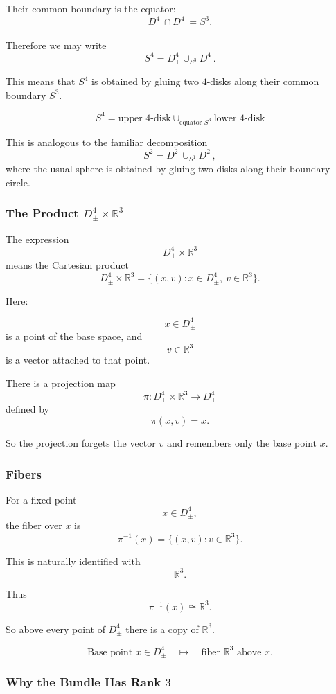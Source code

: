 \documentclass[12pt,a4paper]{article}
\theoremstyle{notespace}
\begin{document}
Their common boundary is the equator:
\[
D^4_+\cap D^4_-=S^3.
\]

Therefore we may write
\[
S^4=D^4_+\cup_{S^3}D^4_-.
\]

This means that \(S^4\) is obtained by gluing two \(4\)-disks along their common boundary \(S^3\).

\[
\boxed{
	S^4
	=
	\text{upper }4\text{-disk}
	\cup_{\text{equator }S^3}
	\text{lower }4\text{-disk}
}
\]

This is analogous to the familiar decomposition
\[
S^2=D^2_+\cup_{S^1}D^2_-,
\]
where the usual sphere is obtained by gluing two disks along their boundary circle.

\subsubsection{The Product \(D^4_\pm\times \mathbb R^3\)}

The expression
\[
D^4_\pm\times \mathbb R^3
\]
means the Cartesian product
\[
D^4_\pm\times \mathbb R^3
=
\{(x,v):x\in D^4_\pm,\ v\in \mathbb R^3\}.
\]

Here:

\[
x\in D^4_\pm
\]
is a point of the base space, and
\[
v\in \mathbb R^3
\]
is a vector attached to that point.

There is a projection map
\[
\pi:D^4_\pm\times \mathbb R^3\longrightarrow D^4_\pm
\]
defined by
\[
\pi(x,v)=x.
\]

So the projection forgets the vector \(v\) and remembers only the base point \(x\).

\subsubsection{Fibers}

For a fixed point
\[
x\in D^4_\pm,
\]
the fiber over \(x\) is
\[
\pi^{-1}(x)
=
\{(x,v):v\in \mathbb R^3\}.
\]

This is naturally identified with
\[
\mathbb R^3.
\]

Thus
\[
\pi^{-1}(x)\cong \mathbb R^3.
\]

So above every point of \(D^4_\pm\) there is a copy of \(\mathbb R^3\).

\[
\boxed{
	\text{Base point }x\in D^4_\pm
	\quad
	\longmapsto
	\quad
	\text{fiber }\mathbb R^3\text{ above }x.
}
\]

\subsubsection{Why the Bundle Has Rank \(3\)}
\end{document}

